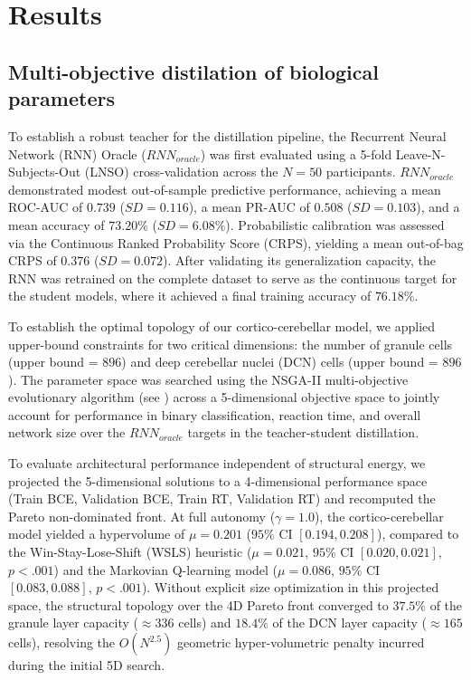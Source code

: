 \documentclass[12pt, a4paper]{extarticle}
\begin{document}
	\section{Results}
	
	\subsection{Multi-objective distilation of biological parameters}
	
	To establish a robust teacher for the distillation pipeline, the Recurrent Neural Network (RNN) Oracle ($RNN_{oracle}$) was first evaluated using a 5-fold Leave-N-Subjects-Out (LNSO) cross-validation across the $N = 50$ participants. $RNN_{oracle}$ demonstrated modest out-of-sample predictive performance, achieving a mean ROC-AUC of $0.739$ ($SD = 0.116$), a mean PR-AUC of $0.508$ ($SD = 0.103$), and a mean accuracy of $73.20\%$ ($SD = 6.08\%$). Probabilistic calibration was assessed via the Continuous Ranked Probability Score (CRPS), yielding a mean out-of-bag CRPS of $0.376$ ($SD = 0.072$). After validating its generalization capacity, the RNN was retrained on the complete dataset to serve as the continuous target for the student models, where it achieved a final training accuracy of $76.18\%$.
	
	To establish the optimal topology of our cortico-cerebellar model, we applied upper-bound constraints for two critical dimensions: the number of granule cells (upper bound = $896$) and deep cerebellar nuclei (DCN) cells (upper bound = $896$). The parameter space was searched using the NSGA-II multi-objective evolutionary algorithm (see ) across a 5-dimensional objective space to jointly account for performance in binary classification, reaction time, and overall network size over the $RNN_{oracle}$ targets in the teacher-student distillation. 
	
	To evaluate architectural performance independent of structural energy, we projected the 5-dimensional solutions to a 4-dimensional performance space (Train BCE, Validation BCE, Train RT, Validation RT) and recomputed the Pareto non-dominated front. At full autonomy ($\gamma = 1.0$), the cortico-cerebellar model yielded a hypervolume of $\mu = 0.201$ ($95\%$ CI $[0.194, 0.208]$), compared to the Win-Stay-Lose-Shift (WSLS) heuristic ($\mu = 0.021$, $95\%$ CI $[0.020, 0.021]$, $p < .001$) and the Markovian Q-learning model ($\mu = 0.086$, $95\%$ CI $[0.083, 0.088]$, $p < .001$). Without explicit size optimization in this projected space, the structural topology over the 4D Pareto front converged to $37.5\%$ of the granule layer capacity ($\approx 336$ cells) and $18.4\%$ of the DCN layer capacity ($\approx 165$ cells), resolving the $O(N^{2.5})$ geometric hyper-volumetric penalty incurred during the initial 5D search.
	
\end{document}
